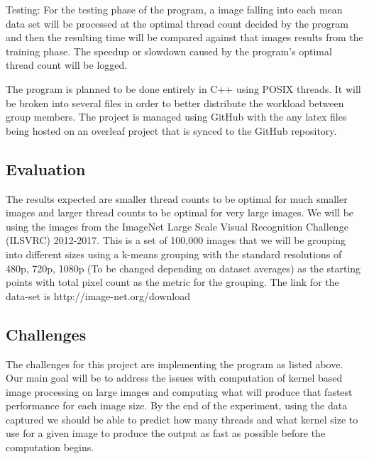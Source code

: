 \documentclass{article}
\begin{document}
\begin{multicols}{2}
                Testing: For the testing phase of the program, a image falling into each mean data set will be processed at the optimal thread count decided by the program and then the resulting time will be compared against that images results from the training phase.  The speedup or slowdown caused by the program's optimal thread count will be logged.
                
                The program is planned to be done entirely in C++ using POSIX threads.  It will be broken into several files in order to better distribute the workload between group members.  The project is managed using GitHub with the any latex files being hosted on an overleaf project that is synced to the GitHub repository.
            
            \subsection{Evaluation}
                The results expected are smaller thread counts to be optimal for much smaller images and larger thread counts to be optimal for very large images.  We will be using the images from the  ImageNet Large Scale Visual Recognition Challenge (ILSVRC) 2012-2017.  This is a set of 100,000 images that we will be grouping into different sizes using a k-means grouping with the standard resolutions of 480p, 720p, 1080p (To be changed depending on dataset averages) as the starting points with total pixel count as the metric for the grouping.  The link for the data-set is http://image-net.org/download
                
            \subsection{Challenges}
                The challenges for this project are implementing the program as listed above.  Our main goal will be to address the issues with computation of kernel based image processing on large images and computing what will produce that fastest performance for each image size.  By the end of the experiment, using the data captured we should be able to predict how many threads and what kernel size to use for a given image to produce the output as fast as possible before the computation begins.
                
            \end{multicols}
            
        \pagebreak
    
\end{document}
